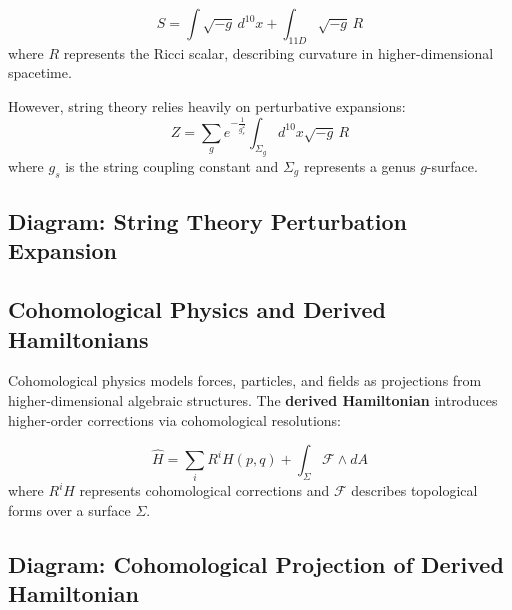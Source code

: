 \documentclass{article}
\begin{document}
\[
S = \int \sqrt{-g} \, d^{10}x + \int_{11D} \sqrt{-g} \, R
\]
where \( R \) represents the Ricci scalar, describing curvature in higher-dimensional spacetime.

However, string theory relies heavily on perturbative expansions:
\[
Z = \sum_{g} e^{-\frac{1}{g_s^2}} \int_{\Sigma_g} d^{10}x \sqrt{-g} \, R
\]
where \( g_s \) is the string coupling constant and \( \Sigma_g \) represents a genus \( g \)-surface.

\subsection{Diagram: String Theory Perturbation Expansion}
\begin{center}
\end{center}

\subsection{Cohomological Physics and Derived Hamiltonians}
Cohomological physics models forces, particles, and fields as projections from higher-dimensional algebraic structures. The \textbf{derived Hamiltonian} introduces higher-order corrections via cohomological resolutions:

\[
\hat{H} = \sum_i R^i H(p, q) + \int_\Sigma \mathcal{F} \wedge dA
\]
where \( R^i H \) represents cohomological corrections and \( \mathcal{F} \) describes topological forms over a surface \( \Sigma \).

\subsection{Diagram: Cohomological Projection of Derived Hamiltonian}
\begin{center}
\end{center}
\end{document}
